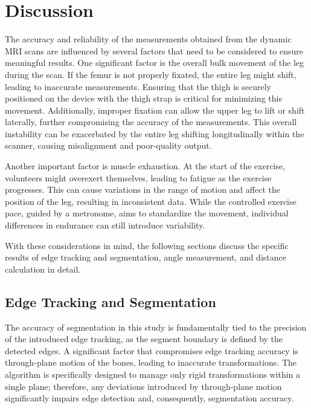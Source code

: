 \documentclass{micro-econ-thesis}
\begin{document}
\section{Discussion}
\label{sec:discussion}

The accuracy and reliability of the measurements obtained from the dynamic MRI scans are influenced by several factors that need to be considered to ensure meaningful results. One significant factor is the overall bulk movement of the leg during the scan. If the femur is not properly fixated, the entire leg might shift, leading to inaccurate measurements. Ensuring that the thigh is securely positioned on the device with the thigh strap is critical for minimizing this movement. Additionally, improper fixation can allow the upper leg to lift or shift laterally, further compromising the accuracy of the measurements. This overall instability can be exacerbated by the entire leg shifting longitudinally within the scanner, causing misalignment and poor-quality output.

Another important factor is muscle exhaustion. At the start of the exercise, volunteers might overexert themselves, leading to fatigue as the exercise progresses. This can cause variations in the range of motion and affect the position of the leg, resulting in inconsistent data. While the controlled exercise pace, guided by a metronome, aims to standardize the movement, individual differences in endurance can still introduce variability.

With these considerations in mind, the following sections discuss the specific results of edge tracking and segmentation, angle measurement, and distance calculation in detail.

\subsection{Edge Tracking and Segmentation}
The accuracy of segmentation in this study is fundamentally tied to the precision of the introduced edge tracking, as the segment boundary is defined by the detected edges. A significant factor that compromises edge tracking accuracy is through-plane motion of the bones, leading to inaccurate transformations. The algorithm is specifically designed to manage only rigid transformations within a single plane; therefore, any deviations introduced by through-plane motion significantly impairs edge detection and, consequently, segmentation accuracy.
\end{document}
